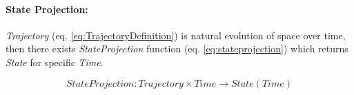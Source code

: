     \paragraph{State Projection:} \emph{Trajectory} (eq. \ref{eq:TrajectoryDefinition}) is natural evolution of space over time, then there exists \emph{StateProjection} function (eq. \ref{eq:stateprojection}) which returns \emph{State} for specific \emph{Time}.
    
    \begin{equation}\label{eq:stateprojection}
        StateProjection:Trajectory\times Time \to State(Time)
    \end{equation}


